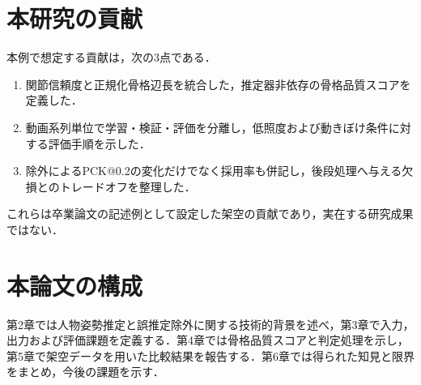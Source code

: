 \section{本研究の貢献}

本例で想定する貢献は，次の3点である．

\begin{enumerate}
  \item 関節信頼度と正規化骨格辺長を統合した，推定器非依存の骨格品質スコアを定義した．
  \item 動画系列単位で学習・検証・評価を分離し，低照度および動きぼけ条件に対する評価手順を示した．
  \item 除外によるPCK@0.2の変化だけでなく採用率も併記し，後段処理へ与える欠損とのトレードオフを整理した．
\end{enumerate}

これらは卒業論文の記述例として設定した架空の貢献であり，実在する研究成果ではない．

\section{本論文の構成}

第2章では人物姿勢推定と誤推定除外に関する技術的背景を述べ，第3章で入力，出力および評価課題を定義する．第4章では骨格品質スコアと判定処理を示し，第5章で架空データを用いた比較結果を報告する．第6章では得られた知見と限界をまとめ，今後の課題を示す．
